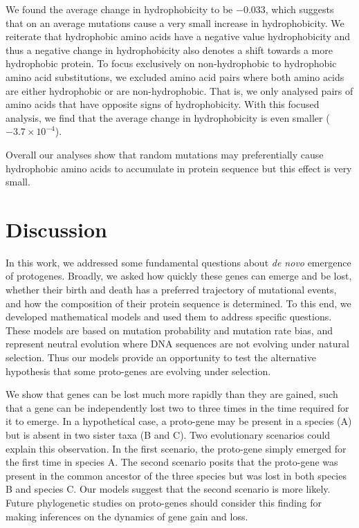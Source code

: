\documentclass[12pt,a4paper]{article}
\begin{document}
We found the average change in hydrophobicity to be $-0.033$, which suggests that on an average mutations cause a very small increase in hydrophobicity. We reiterate that hydrophobic amino acids have a negative value hydrophobicity and thus a negative change in hydrophobicity also denotes a shift towards a more hydrophobic protein. To focus exclusively on non-hydrophobic to hydrophobic amino acid substitutions, we excluded amino acid pairs where both amino acids are either hydrophobic or are non-hydrophobic. That is, we only analysed pairs of amino acids that have opposite signs of hydrophobicity. With this focused analysis, we find that the average change in hydrophobicity is even smaller ($-3.7\times 10^{-4}$).

Overall our analyses show that random mutations may preferentially cause hydrophobic amino acids to accumulate in protein sequence but this effect is very small.

\section{Discussion} 

In this work, we addressed some fundamental questions about \textit{de novo} emergence of protogenes. Broadly, we asked how quickly these genes can emerge and be lost, whether their birth and death has a preferred trajectory of mutational events, and how the composition of their protein sequence is determined. To this end, we developed mathematical models and used them to address specific questions. These models are based on mutation probability and mutation rate bias, and represent neutral evolution where DNA sequences are not evolving under natural selection. Thus our models provide an opportunity to test the alternative hypothesis that some proto-genes are evolving under selection.

We show that genes can be lost much more rapidly than they are gained, such that a gene can be independently lost two to three times in the time required for it to emerge. In a hypothetical case, a proto-gene may be present in a species (A) but is absent in two sister taxa (B and C). Two evolutionary scenarios could explain this observation. In the first scenario, the proto-gene simply emerged for the first time in species A. The second scenario posits that the proto-gene was present in the common ancestor of the three species but was lost in both species B and species C. Our models suggest that the second scenario is more likely. Future phylogenetic studies on proto-genes should consider this finding for making inferences on the dynamics of gene gain and loss.
\end{document}
